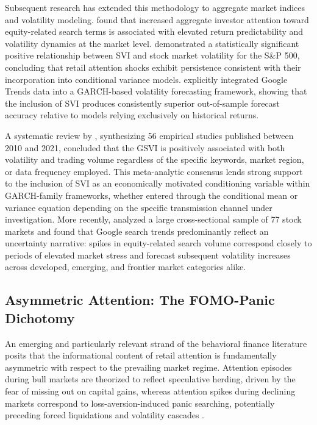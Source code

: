 \documentclass[12pt, a4paper]{article}
\begin{document}
Subsequent research has extended this methodology to aggregate market indices and volatility modeling. \citet{vozlyublennaia2014} found that increased aggregate investor attention toward equity-related search terms is associated with elevated return predictability and volatility dynamics at the market level. \citet{dimpfl2016} demonstrated a statistically significant positive relationship between SVI and stock market volatility for the S\&P 500, concluding that retail attention shocks exhibit persistence consistent with their incorporation into conditional variance models. \citet{hamid2015} explicitly integrated Google Trends data into a GARCH-based volatility forecasting framework, showing that the inclusion of SVI produces consistently superior out-of-sample forecast accuracy relative to models relying exclusively on historical returns.

A systematic review by \citet{ayala2024}, synthesizing 56 empirical studies published between 2010 and 2021, concluded that the GSVI is positively associated with both volatility and trading volume regardless of the specific keywords, market region, or data frequency employed. This meta-analytic consensus lends strong support to the inclusion of SVI as an economically motivated conditioning variable within GARCH-family frameworks, whether entered through the conditional mean or variance equation depending on the specific transmission channel under investigation. More recently, \citet{szczygielski2023} analyzed a large cross-sectional sample of 77 stock markets and found that Google search trends predominantly reflect an uncertainty narrative: spikes in equity-related search volume correspond closely to periods of elevated market stress and forecast subsequent volatility increases across developed, emerging, and frontier market categories alike.

\subsection{Asymmetric Attention: The FOMO-Panic Dichotomy}

An emerging and particularly relevant strand of the behavioral finance literature posits that the informational content of retail attention is fundamentally asymmetric with respect to the prevailing market regime. Attention episodes during bull markets are theorized to reflect speculative herding, driven by the fear of missing out on capital gains, whereas attention spikes during declining markets correspond to loss-aversion-induced panic searching, potentially preceding forced liquidations and volatility cascades \citep{fong2002}.
\end{document}

